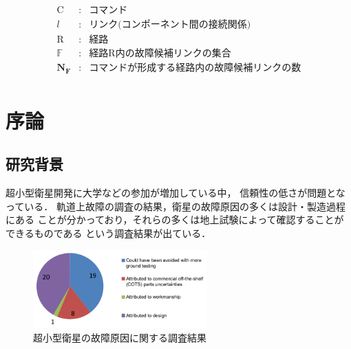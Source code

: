 \documentclass[11pt]{jsarticle}%
\begin{document}
\begin{multicols}{2}
\vspace{-12zh}
\begin{eqnarray*}
   \text{C} &:& \text{コマンド} \\
   l&:& \text{リンク(コンポーネント間の接続関係)}\\
   \text{R}&:& \text{経路}\\
   \mathbb{F}&:& \text{経路R内の故障候補リンクの集合}\\
   \mathbf{N_F}&:& \text{コマンドが形成する経路内の故障候補リンクの数}\\
\end{eqnarray*}
\vspace{-6zh}
  \section{序論}
  \vspace{-1zh}
  \subsection{研究背景}
  \vspace{-1zh}
  超小型衛星開発に大学などの参加が増加している中，
  信頼性の低さが問題となっている\cite{Langer2016}．
  軌道上故障の調査の結果，衛星の故障原因の多くは設計・製造過程にある\cite{Venturini2017}
  ことが分かっており，それらの多くは地上試験によって確認することができるものである
  という調査結果が出ている\cite{SAITO2011}．
 

  \begin{figure}[H]
    \centering
      \includegraphics[height=3.0cm]{../figure/cause_of_failure.png}
      \caption{超小型衛星の故障原因に関する調査結果\cite{Venturini2017}}
      \label{fig:cause_of_failure}
  \end{figure}
  

\end{multicols}
\end{document}
